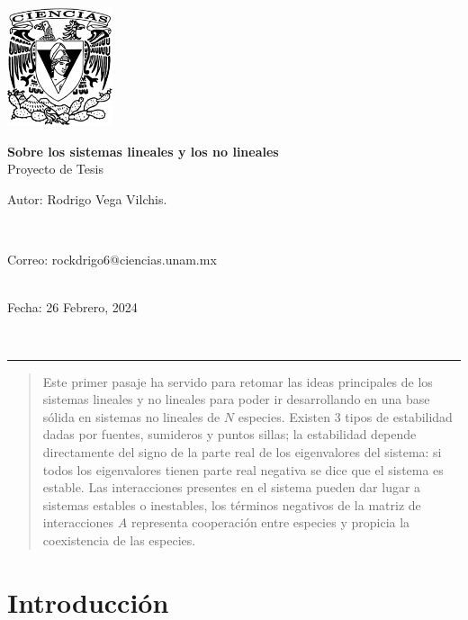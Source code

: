 \documentclass[11pt,a4paper]{article}
\begin{document}
\thispagestyle{empty}
\includegraphics[height=3.5cm]{escudoCiencias.pdf}
\vspace{-3.8cm}
\begin{flushright}
\hspace{4cm}
{\Large\textbf{Sobre los sistemas lineales y los no lineales}\\
Proyecto de Tesis}
\vspace{0.3cm}\\
\begin{large}Autor: Rodrigo Vega Vilchis.\end{large}\\
\begin{footnotesize}
Correo: rockdrigo6@ciencias.unam.mx\\
\\
\end{footnotesize}
\vspace{0.1cm}
\begin{large}
Fecha: 26 Febrero, 2024\end{large}\\
\end{flushright}
 \hrule height1pt\vspace{.5cm}
\begin{abstract}
Este primer pasaje ha servido para retomar las ideas principales de los sistemas lineales y no lineales para poder ir desarrollando en una base sólida en sistemas no lineales de $N$ especies. Existen 3 tipos de estabilidad dadas por fuentes, sumideros y puntos sillas; la estabilidad depende directamente del signo de la parte real de los eigenvalores del sistema: si todos los eigenvalores tienen parte real negativa se dice que el sistema es estable. Las interacciones presentes en el sistema pueden dar lugar a sistemas estables o inestables, los términos negativos de la matriz de interacciones $A$ representa cooperación entre especies y propicia la coexistencia de las especies.
\end{abstract}

\section{Introducción}
\end{document}
